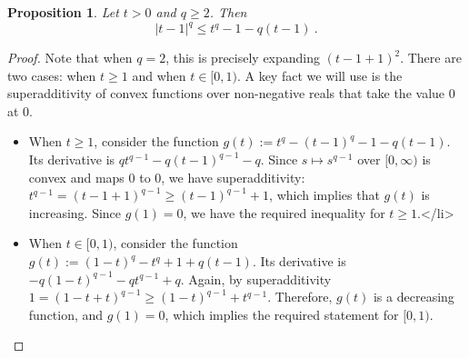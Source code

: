 \documentclass[11pt]{article}
\newtheorem{proposition}{Proposition}[section]
\newcounter{ct}
\begin{document}
\begin{proposition}
\label{prop:algebraic-identity}
Let \(t > 0\) and \(q \geq 2\).
Then
\begin{equation*}
    |t - 1|^{q} \leq t^{q} - 1 - q(t - 1)~.
\end{equation*}
\end{proposition}
\begin{proof}
    Note that when \(q = 2\), this is precisely expanding \((t - 1 + 1)^{2}\).
    There are two cases: when \(t \geq 1\) and when \(t \in [0, 1)\).
    A key fact we will use is the superadditivity of convex functions over non-negative reals that take the value \(0\) at \(0\).
    \begin{itemize}
        \item When \(t \geq 1\), consider the function \(g(t) := t^{q} - (t - 1)^{q} - 1 - q(t - 1)\).
        Its derivative is \(qt^{q - 1} - q(t - 1)^{q - 1} - q\).
        Since \(s \mapsto s^{q - 1}\) over \([0, \infty)\) is convex and maps \(0\) to \(0\), we have superadditivity: \(t^{q - 1} = (t - 1 + 1)^{q - 1} \geq (t - 1)^{q- 1} + 1\), which implies that \(g(t)\) is increasing.
        Since \(g(1) = 0\), we have the required inequality for \(t \geq 1\).</li>
    
        \item When \(t \in [0, 1)\), consider the function \(g(t) := (1 - t)^{q} - t^{q} + 1 + q(t - 1)\).
        Its derivative is \(-q(1 - t)^{q - 1} - qt^{q - 1} + q\).
        Again, by superadditivity \(1 = (1 - t + t)^{q - 1} \geq (1 - t)^{q - 1} + t^{q - 1}\).
        Therefore, \(g(t)\) is a decreasing function, and \(g(1) = 0\), which implies the required statement for \([0, 1)\).
    \end{itemize}
\end{proof}
\end{document}
